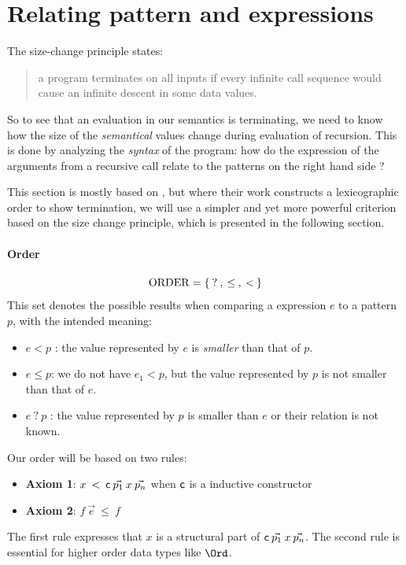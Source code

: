 \newcommand{\order}{\opn{ORDER}}

\section{Relating pattern and expressions}


The size-change principle \cite{lee01sizechange} states:
\begin{quote}
a program terminates on all inputs if every infinite call sequence would cause an infinite descent in some data values.
\end{quote}

So to see that an evaluation in our semantics is terminating, we need to know how the size of the \emph{semantical} values change during evaluation of recursion.
This is done by analyzing the \emph{syntax} of the program: how do the expression of the arguments from a recursive call relate to the patterns on the right hand side ?

This section is mostly based on \cite{abelAltenkirch:predStRec}, but where their work constructs a lexicographic order to show termination, we will use a simpler and yet more powerful criterion based on the size change principle, which is presented in the following section.

\paragraph*{Order}
\[ \order = \{ \: ? \: , \: \leq \: , \: < \: \} \]
\noindent This set denotes the possible results when comparing a expression $e$ to a pattern $p$, with the intended meaning:
\begin{itemize}
\item
$e < p$ : the value represented by $e$ is \emph{smaller} than that of $p$.
\item
$e \leq p $: we do not have $e_1 < p$, but the value represented by $p$ is not smaller than that of $e$.
\item
$e \: ? \: p $ : the value represented by $p$ is smaller than $e$ or their relation is not known.
\end{itemize}
Our order will be based on two rules:
\begin{itemize}
\item
\textbf{Axiom 1}: $x \: < \: \mathsf{c} \: \vec{p_1} \: x \: \vec{p_n} $ when $\mathsf{c}$ is a inductive constructor
\item
\textbf{Axiom 2}: $f \: \vec{e} \: \leq \: f $
\end{itemize}
The first rule expresses that $x$ is a structural part of $\mathsf{c} \: \vec{p_1} \: x \: \vec{p_n}$.
The second rule is essential for higher order data types like $\Ord$.



